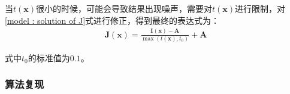 \documentclass[UTF8]{ctexart}
\begin{document}
                \indent 当$t\left( \mathbf{x} \right)$很小的时候，可能会导致结果出现噪声，需要对$t\left( \mathbf{x} \right)$进行限制，对\ref{model : solution of J}式进行修正，得到最终的表达式为：
                    \begin{align}
                        \mathbf{J}\left( \mathbf{x} \right) = \frac{ \mathbf{I}\left( \mathbf{x} \right) - \mathbf{A} }{ \mathop{max}\left( t\left( \mathbf{x} \right), t_0 \right) } + \mathbf{A} \label{model : final solution of J}
                    \end{align}
                    
                \indent 式中$t_0$的标准值为$0.1$。
        
            \subsubsection{算法复现}
\end{document}
